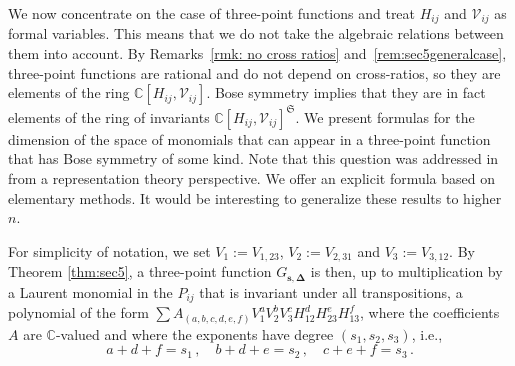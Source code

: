 \documentclass[12pt,a4paper]{extarticle}
\theoremstyle{definition}
\begin{document}
\medskip

We now concentrate on the case of three-point functions and treat $H_{ij}$ and $\mathcal{V}_{ij}$ as formal variables. This means that we do not take the algebraic relations between them into account. By Remarks~\ref{rmk: no cross ratios} and~\ref{rem:sec5generalcase},  three-point functions are rational and do not depend on cross-ratios, so they are elements of the ring $\mathbb{C}[H_{ij},\mathcal{V}_{ij}]$. Bose symmetry implies that they are in fact elements of the ring of invariants $\mathbb{C}[H_{ij},\mathcal{V}_{ij}]^{\mathfrak{S}}$. We present formulas for the dimension of the space of monomials that can appear in a three-point function that has Bose symmetry of some kind. Note that this question was addressed in \cite[Section 2.5.1]{KSD} from a representation theory perspective. We offer an explicit formula based on elementary methods. It would be interesting to generalize these results to higher~$n$.

\medskip

For simplicity of notation, we set $V_1:=V_{1,23}$, $V_2:=V_{2,31}$ and $V_3:=V_{3,12}$. By Theorem \ref{thm:sec5}, a three-point function $G_{\mathbf{s},\mathbf{\Delta}}$ is then, up to multiplication by a Laurent monomial in the $P_{ij}$ that is invariant under all transpositions, a polynomial of the form $\sum A_{(a,b,c,d,e,f)}V_1^aV_2^bV_3^cH_{12}^dH_{23}^eH_{13}^f$, where the coefficients $A$ are $\mathbb{C}$-valued and where the exponents have degree $(s_1,s_2,s_3)$, i.e.,
\begin{equation}\label{eqn: exponent relations}
    a+d+f=s_1\,,\quad b+d+e=s_2\,,\quad c+e+f=s_3\,.
\end{equation}
\end{document}
